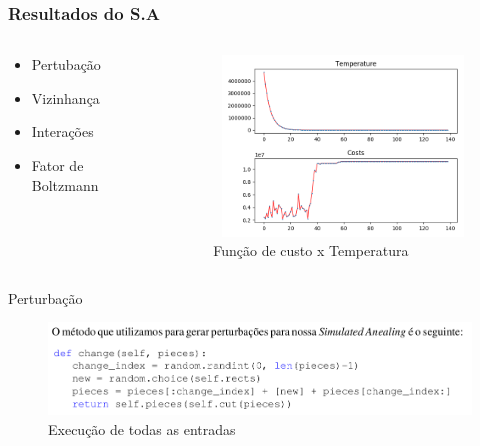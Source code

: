 \documentclass[aspectratio=169]{beamer}
\theoremstyle{Definition}
\begin{document}
\begin{frame}
	\frametitle{Resultados do S.A}
	
		\begin{columns}
		\begin{column}{0.5\textwidth}
		   \begin{itemize}
		   		\item Pertubação
				\item Vizinhança
				\item Interações
				\item Fator de Boltzmann
			\end{itemize}
		\end{column}
		\begin{column}{0.5\textwidth}  %
    		\begin{figure}[h]
	   	 		\includegraphics[width=7cm, height=4.8cm]{imagens/plot}
			    \caption{Função de custo x Temperatura}
	  		\end{figure}
		\end{column}
	\end{columns}
\end{frame}

\begin{frame}[t]{Perturbação}
    \begin{figure}[htpb]
        \centering
        \includegraphics[width=0.8\linewidth]{imagens/change}
        \caption{Execução de todas as entradas}
        \label{fig:}
    \end{figure}
\end{frame}
\end{document}
